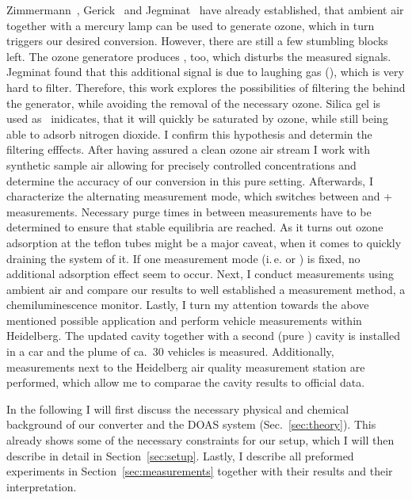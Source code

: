 Zimmermann~\cite{zimmermann}, Gerick~\cite{gerick} and
Jegminat~\cite{bsc} have already established, that ambient air
together with a mercury lamp can be used to generate ozone, which in
turn triggers our desired conversion. However, there are still a few
stumbling blocks left. The ozone generatore produces , too,
which disturbs the measured  signals. Jegminat found that
this additional signal is due to laughing gas (), which is
very hard to filter. Therefore, this work explores the possibilities
of filtering the  behind the generator, while avoiding the
removal of the necessary ozone. Silica gel is used
as~\cite{ozone-silica} inidicates, that it will quickly be saturated
by ozone, while still being able to adsorb nitrogen dioxide. I confirm
this hypothesis and determin the filtering efffects. After having
assured a clean ozone air stream I work with synthetic sample air
allowing for precisely controlled  concentrations and determine
the accuracy of our conversion in this pure 
setting. Afterwards, I characterize the alternating measurement mode,
which switches between  and + measurements.
Necessary purge times in between measurements have to be determined to
ensure that stable equilibria are reached. As it turns out ozone
adsorption at the teflon tubes might be a major caveat, when it comes
to quickly draining the system of it. If one measurement mode
(i.\,e.  or ) is fixed, no additional adsorption
effect seem to occur. Next, I conduct measurements using ambient air
and compare our results to well established a  measurement
method, a chemiluminescence monitor. Lastly, I turn my attention
towards the above mentioned possible application and perform vehicle
measurements within Heidelberg. The updated cavity together with a
second (pure ) cavity is installed in a car and the plume of
ca.~30 vehicles is measured. Additionally, measurements next to the
Heidelberg air quality measurement station are performed, which allow
me to comparae the cavity results to official data.

In the following I will first discuss the necessary physical and
chemical background of our converter and the DOAS system
(Sec.~\ref{sec:theory}). This already shows some of the necessary
constraints for our setup, which I will then describe in detail in
Section~\ref{sec:setup}. Lastly, I describe all preformed experiments
in Section~\ref{sec:measurements} together with their results and their
interpretation.

